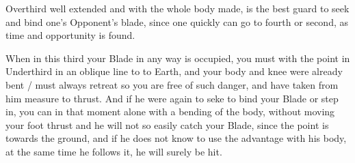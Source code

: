 Overthird well extended and with the whole body made, is the best
guard to seek and bind one's Opponent's blade, since one quickly can
go to fourth or second, as time and opportunity is found.

When in this third your Blade in any way is occupied, you must with
the point in Underthird in an oblique line to to Earth, and your body and knee were already bent /
must always retreat so you are free of such danger, and have taken
from him measure to thrust. And if he were again to seke to bind your
Blade or step in, you can in that moment alone with a bending of the
body, without moving your foot thrust and he will not so easily catch
your Blade, since the point is towards the ground, and if he does not
know to use the advantage with his body, at the same time he follows
it, he will surely be hit.
